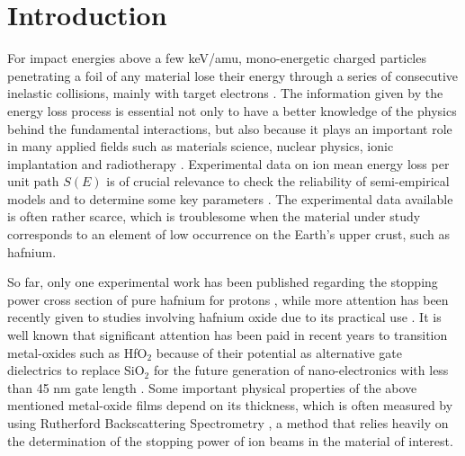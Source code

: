 \documentclass[aps,pra,reprint,groupedaddress]{revtex4-1}
\begin{document}
\section{Introduction}
\label{intro}

For impact energies above a few keV/amu, mono-energetic charged particles penetrating a foil of any material lose their energy through a series of consecutive inelastic collisions, mainly with target electrons \cite{Chu01,Sigmund}. The information given by the energy loss process is essential not only to have a better knowledge of the physics behind the fundamental interactions, but also because it plays an important role in many applied fields such as materials science, nuclear physics, ionic implantation and radiotherapy \cite{Sigmund,Schardt}. Experimental data on ion mean energy loss per unit path $S(E)$ is of crucial relevance to check the reliability of semi-empirical models and to determine some key parameters 
\cite{Diwan,Damache04,Damache02}. The experimental data available is often rather scarce, which is %
troublesome when the material under study corresponds to an element of low occurrence on the Earth's upper crust, such as hafnium.

So far, only one experimental work has been published regarding the stopping power cross section of pure hafnium for protons \cite{Sirotinin}, while more attention has been recently given to studies involving hafnium oxide due to its practical use \cite{Abril,Behar,Primetzhofer}. It is well known that significant attention has been paid in recent years to transition metal-oxides such as HfO$_2$ because of their potential as alternative gate dielectrics to replace SiO$_2$ for the future generation of nano-electronics with less than 45 nm gate length \cite{Choi,Robertson}.  Some important physical properties of the above mentioned metal-oxide films depend on its thickness, which is often measured by using Rutherford Backscattering Spectrometry \cite{Alfassi01, Tesmer01}, a method that relies heavily on the determination of the stopping power of ion beams in the material of interest.
\end{document}
